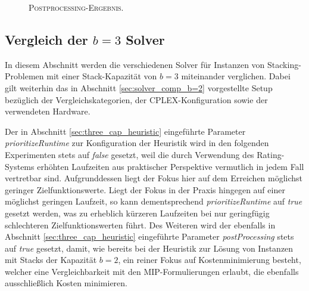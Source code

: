 \begin{figure}[H]
  \centering
    \caption{\textsc{Postprocessing-Ergebnis.}}
    \label{fig:valid_solution_post_processing}
\end{figure}

\vfill
\pagebreak

\subsection{Vergleich der $b = 3$ Solver}
\label{sec:solver_comp_b=3}

In diesem Abschnitt werden die verschiedenen Solver für Instanzen von Stacking-Problemen mit einer Stack-Kapazität
von $b = 3$ miteinander verglichen. Dabei gilt weiterhin das in Abschnitt \ref{sec:solver_comp_b=2} vorgestellte Setup
bezüglich der Vergleichskategorien, der \textsc{CPLEX}-Konfiguration sowie der verwendeten Hardware.

Der in Abschnitt \ref{sec:three_cap_heuristic} eingeführte Parameter \textit{prioritizeRuntime} zur Konfiguration der Heuristik
wird in den folgenden Experimenten stets auf \textit{false} gesetzt, weil die durch Verwendung des Rating-Systems erhöhten Laufzeiten
aus praktischer Perspektive vermutlich in jedem Fall vertretbar sind. Aufgrunddessen liegt der Fokus hier auf dem Erreichen
möglichst geringer Zielfunktionswerte. Liegt der Fokus in der Praxis hingegen auf einer möglichst geringen Laufzeit, so kann dementsprechend \textit{prioritizeRuntime} auf \textit{true} gesetzt werden, was zu erheblich kürzeren Laufzeiten bei nur geringfügig schlechteren Zielfunktionswerten führt.
Des Weiteren wird der ebenfalls in Abschnitt \ref{sec:three_cap_heuristic} eingeführte Parameter \textit{postProcessing}
stets auf \textit{true} gesetzt, damit, wie bereits bei der Heuristik zur Lösung von Instanzen mit Stacks der Kapazität $b = 2$,
ein reiner Fokus auf Kostenminimierung besteht, welcher eine Vergleichbarkeit mit den MIP-Formulierungen erlaubt, die ebenfalls
ausschließlich Kosten minimieren.

